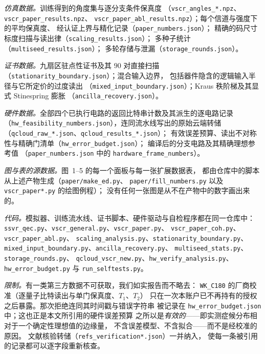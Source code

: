 \documentclass[11pt,a4paper]{article}
\begin{document}
\emph{仿真数据。}训练得到的角度集与逐分支条件保真度
（\texttt{vscr\_angles\_*.npz}、\texttt{vscr\_paper\_results.npz}、
\texttt{vscr\_paper\_abl\_results.npz}）；每个信道与强度下的平均保真度、
经认证上界与精化记录（\texttt{paper\_numbers.json}）；
精确的码尺寸标度扫描与读出律（\texttt{scaling\_results.json}）；
多种子统计（\texttt{multiseed\_results.json}）；
多轮存储与泄漏（\texttt{storage\_rounds.json}）。

\emph{证书数据。}九扇区驻点性证书及其 $90$ 对直接扫描
（\texttt{stationarity\_boundary.json}）；混合输入边界，
包括器件隐含的逻辑输入半径与它所定价的过度读出
（\texttt{mixed\_input\_boundary.json}）；Kraus 秩阶梯及其显式 Stinespring 膨胀
（\texttt{ancilla\_recovery.json}）。

\emph{硬件数据。}全部四个已执行电路的返回比特串计数及其派生的逐电路记录
（\texttt{hw\_feasibility\_numbers.json}），连同流水线写出的原始云端转储
（\texttt{qcloud\_raw\_*.json}、\texttt{qcloud\_results\_*.json}）；
有效误差预算、读出不对称性与精确门清单（\texttt{hw\_error\_budget.json}）；
编译后的分支电路及其精确理想参考值
（\texttt{paper\_numbers.json} 中的 \texttt{hardware\_frame\_numbers}）。

\emph{图与表的源数据。}图~1--5 的每一个面板与每一张扩展数据表，
都由仓库中的脚本从上述产物生成（\texttt{paper/make\_ed.py}、
\texttt{paper/fill\_numbers.py} 以及 \texttt{vscr\_paper*.py} 的绘图例程）；
没有任何一张图是从不在产物中的数字画出来的。

\emph{代码。}模拟器、训练流水线、证书脚本、硬件驱动与自检程序都在同一仓库中：
\texttt{ssvr\_qec.py}、\texttt{vscr\_general.py}、\texttt{vscr\_paper.py}、
\texttt{vscr\_paper\_coh.py}、\texttt{vscr\_paper\_abl.py}、
\texttt{scaling\_analysis.py}、\texttt{stationarity\_boundary.py}、
\texttt{mixed\_input\_boundary.py}、\texttt{ancilla\_recovery.py}、
\texttt{multiseed\_stats.py}、\texttt{storage\_rounds.py}、
\texttt{qcloud\_vscr\_new.py}、\texttt{hw\_verify\_analysis.py}、
\texttt{hw\_error\_budget.py} 与 \texttt{run\_selftests.py}。

\emph{限制。}有一类第三方数据不可获取，我们如实报告而不略去：
\texttt{WK\_C180} 的厂商校准（逐量子比特读出与单门保真度、$T_1$、$T_2$）
只在一次本账户已不再持有的授权之后暴露。那次拒绝连同其时间戳与错误字符串
被记录在 \texttt{hw\_error\_budget.json} 中；这也正是本文所引用的硬件误差预算
之所以是\emph{有效的}——即实测症候分布相对于一个确定性理想值的边缘量，
不含误差模型、不含拟合——而不是经校准的原因。
文献核验转储（\texttt{refs\_verification*.json}）一并纳入，
使每一条被引用的记录都可以逐字段重新核查。



\end{document}
